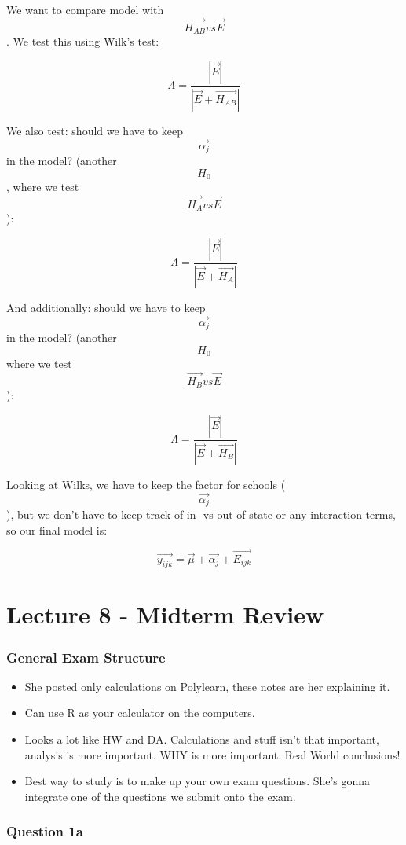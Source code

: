 \documentclass[]{article}
\providecommand{\tightlist}{%
  \setlength{\itemsep}{0pt}\setlength{\parskip}{0pt}}
\begin{document}
We want to compare model with \[\vec{H_{AB}} vs \vec{E}\]. We test this
using Wilk's test:

\[\Lambda = \frac{| \vec{E} |}{| \vec{E} + \vec{H_{AB}} |}\]

We also test: should we have to keep \[ \vec{\alpha_j} \] in the model?
(another \[H_0\], where we test \[\vec{H_A} vs \vec{E}\]):

\[\Lambda = \frac{| \vec{E} |}{| \vec{E} + \vec{H_{A}} |}\]

And additionally: should we have to keep \[ \vec{\alpha_j} \] in the
model? (another \[H_0\] where we test \[\vec{H_B} vs \vec{E}\]):

\[\Lambda = \frac{| \vec{E} |}{| \vec{E} + \vec{H_{B}} |}\]

Looking at Wilks, we have to keep the factor for schools
(\[\vec{\alpha_j}\]), but we don't have to keep track of in- vs
out-of-state or any interaction terms, so our final model is:

\[\vec{y_{ijk}} = \vec{\mu} + \vec{\alpha_j} + \vec{E_{ijk}}\]

\hypertarget{lecture-8---midterm-review}{%
\section{Lecture 8 - Midterm Review}\label{lecture-8---midterm-review}}

\hypertarget{general-exam-structure}{%
\subsubsection{General Exam Structure}\label{general-exam-structure}}

\begin{itemize}
\tightlist
\item
  She posted only calculations on Polylearn, these notes are her
  explaining it.
\item
  Can use R as your calculator on the computers.
\item
  Looks a lot like HW and DA. Calculations and stuff isn't that
  important, analysis is more important. WHY is more important. Real
  World conclusions!
\item
  Best way to study is to make up your own exam questions. She's gonna
  integrate one of the questions we submit onto the exam.
\end{itemize}

\hypertarget{question-1a}{%
\subsubsection{Question 1a}\label{question-1a}}
\end{document}
